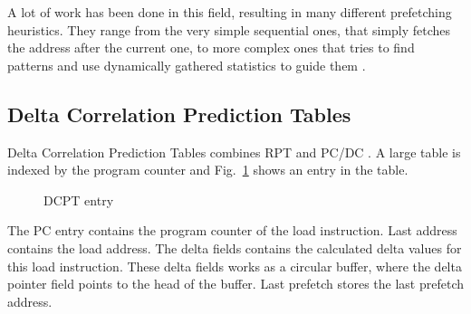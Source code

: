 A lot of work has been done in this field, resulting in many different prefetching heuristics. They
range from the very simple sequential ones, that simply fetches the address after the current one,
to more complex ones that tries to find patterns and use dynamically gathered statistics to guide
them \cite{prefetch_range}.

\subsection{Delta Correlation Prediction Tables} 
Delta Correlation Prediction Tables combines RPT and PC/DC \cite{dcpt}. A large table is indexed by
the program counter and Fig.~\ref{fig:dcpt_entry} shows an entry in the table.
\begin{figure}[h]
	\begin{center}
	\end{center}
	\caption{DCPT entry\label{fig:dcpt_entry}}
\end{figure}
The PC entry contains the program counter of the load instruction. Last address contains the load
address. The delta fields contains the calculated delta values for this load instruction. These
delta fields works as a circular buffer, where the delta pointer field points to the head of the
buffer. Last prefetch stores the last prefetch address.






